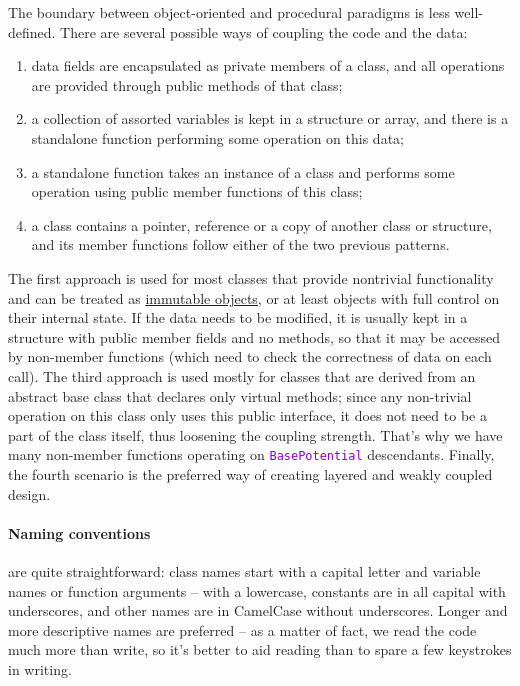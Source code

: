 \documentclass[12pt]{article}
\newcommand{\ttt}[1]{\textcolor{darkviolet}{\texttt{#1}}}
\begin{document}
The boundary between object-oriented and procedural paradigms is less well-defined. There are several possible ways of coupling the code and the data:
\begin{enumerate} \setlength{\parskip}{2pt} \setlength{\itemsep}{2pt}
\item data fields are encapsulated as private members of a class, and all operations are provided through public methods of that class;
\item a collection of assorted variables is kept in a structure or array, and there is a standalone function performing some operation on this data;
\item a standalone function takes an instance of a class and performs some operation using public member functions of this class;
\item a class contains a pointer, reference or a copy of another class or structure, and its member functions follow either of the two previous patterns.
\end{enumerate}

The first approach is used for most classes that provide nontrivial functionality and can be treated as \hyperref[sec:Const]{immutable objects}, or at least objects with full control on their internal state. If the data needs to be modified, it is usually kept in a structure with public member fields and no methods, so that it may be accessed by non-member functions (which need to check the correctness of data on each call). The third approach is used mostly for classes that are derived from an abstract base class that declares only virtual methods; since any non-trivial operation on this class only uses this public interface, it does not need to be a part of the class itself, thus loosening the coupling strength. That's why we have many non-member functions operating on \ttt{BasePotential} descendants. Finally, the fourth scenario is the preferred way of creating layered and weakly coupled design.

\paragraph{Naming conventions}  are quite straightforward: class names start with a capital letter and variable names or function arguments -- with a lowercase, constants are in all capital with underscores, and other names are in CamelCase without underscores. Longer and more descriptive names are preferred -- as a matter of fact, we read the code much more than write, so it's better to aid reading than to spare a few keystrokes in writing.
\end{document}
